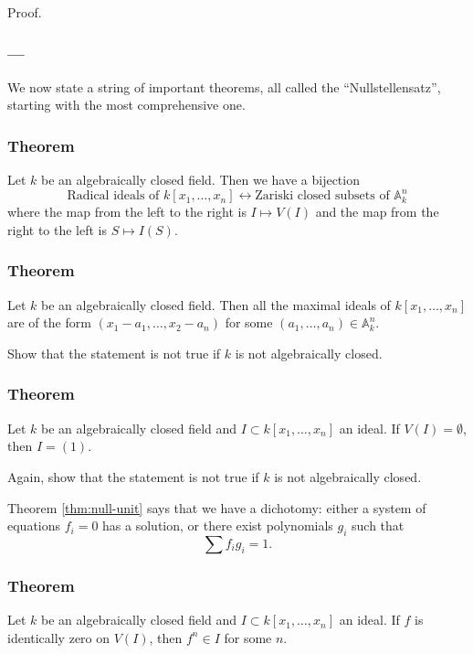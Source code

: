 \documentclass[11pt]{article}
\begin{document}
\begin{skipped}
Proof.
\end{skipped}

\subsubsection*{---}
\label{sec:org5414699}
We now state a string of important theorems, all called the ``Nullstellensatz'', starting with the most comprehensive one.
\subsubsection{Theorem}
\label{sec:orge580319}
\label{thm:null}
Let \(k\) be an algebraically closed field. Then we have a bijection
\[ \text{Radical ideals of \(k[x_1, \dots, x_n]\)} \leftrightarrow \text{Zariski closed subsets of \(\mathbb A^n_k\)}\]
where the map from the left to the right is \(I \mapsto V(I)\) and the map from the right to the left is \(S \mapsto I(S)\).

\subsubsection{Theorem}
\label{sec:org710187d}
\label{thm:null-max}
Let \(k\) be an algebraically closed field. Then all the maximal ideals of \(k[x_1,\dots,x_n]\) are of the form \((x_1-a_1, \dots, x_2-a_n)\) for some \((a_1, \dots, a_n) \in \mathbb A^n_k\).

\begin{skipped}
Show that the statement is not true if \(k\) is not algebraically closed.
\end{skipped}

\subsubsection{Theorem}
\label{sec:orge0e1d53}
\label{thm:null-unit}
 Let \(k\) be an algebraically closed field and \(I \subset k[x_1,\dots,x_n]\) an ideal. If \(V(I) = \emptyset\), then \(I = (1)\).

\begin{skipped}
Again, show that the statement is not true if \(k\) is not algebraically closed.
\end{skipped}
Theorem \ref{thm:null-unit} says that we have a dichotomy: either a system of equations \(f_i = 0\) has a solution, or there exist polynomials \(g_i\) such that
 \[ \sum f_i g_i = 1.\]

\subsubsection{Theorem}
\label{sec:org6cc55a5}
\label{thm:null-power}
Let \(k\) be an algebraically closed field and \(I \subset k[x_1,\dots,x_n]\) an ideal. If \(f\) is identically zero on \(V(I)\), then \(f^n \in I\) for some \(n\).
\end{document}
